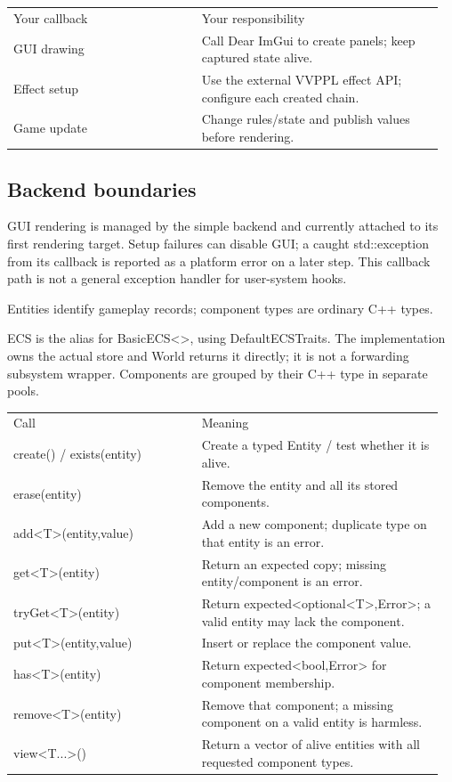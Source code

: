 \documentclass[11pt,a4paper]{article}
\begin{document}
{\small
\begin{longtable}{@{}p{0.42\linewidth}p{0.54\linewidth}@{}}
Your callback & Your responsibility \\
GUI drawing & Call Dear ImGui to create panels; keep captured state alive. \\
Effect setup & Use the external VVPPL effect API; configure each created chain. \\
Game update & Change rules/state and publish values before rendering. \\
\end{longtable}
}

\subsection*{Backend boundaries}
GUI rendering is managed by the simple backend and currently attached to its first rendering target. Setup failures can disable GUI; a caught std::exception from its callback is reported as a platform error on a later step. This callback path is not a general exception handler for user-system hooks.

\label{core-19}
Entities identify gameplay records; component types are ordinary C++ types.

ECS is the alias for BasicECS<>, using DefaultECSTraits. The implementation owns the actual store and World returns it directly; it is not a forwarding subsystem wrapper. Components are grouped by their C++ type in separate pools.

{\small
\begin{longtable}{@{}p{0.42\linewidth}p{0.54\linewidth}@{}}
Call & Meaning \\
create() / exists(entity) & Create a typed Entity / test whether it is alive. \\
erase(entity) & Remove the entity and all its stored components. \\
add<T>(entity,value) & Add a new component; duplicate type on that entity is an error. \\
get<T>(entity) & Return an expected copy; missing entity/component is an error. \\
tryGet<T>(entity) & Return expected<optional<T>,Error>; a valid entity may lack the component. \\
put<T>(entity,value) & Insert or replace the component value. \\
has<T>(entity) & Return expected<bool,Error> for component membership. \\
remove<T>(entity) & Remove that component; a missing component on a valid entity is harmless. \\
view<T...>() & Return a vector of alive entities with all requested component types. \\
\end{longtable}
}
\end{document}
